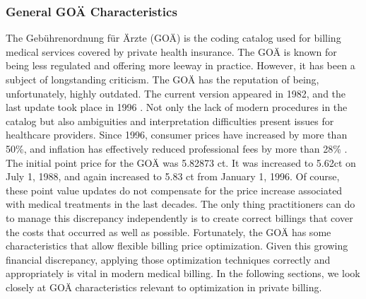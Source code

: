 \subsubsection{General GOÄ Characteristics}
The Gebührenordnung für Ärzte (GOÄ) is the coding catalog used for billing medical services covered by private health insurance.
The GOÄ is known for being less regulated and offering more leeway in practice.
However, it has been a subject of longstanding criticism.
The GOÄ has the reputation of being, unfortunately, highly outdated.
The current version appeared in 1982, and the last update took place in 1996 \cite{heller2015goa}.
Not only the lack of modern procedures in the catalog but also ambiguities and interpretation difficulties present issues for healthcare providers.
Since 1996, consumer prices have increased by more than 50\%, and inflation has effectively reduced professional fees by more than 28\% \cite{schmitzgoa}.
The initial point price for the GOÄ was 5.82873 ct.
It was increased to 5.62ct on July 1, 1988, and again increased to 5.83 ct from January 1, 1996\cite{hermanns2013bemessung}.
Of course, these point value updates do not compensate for the price increase associated with medical treatments in the last decades.
The only thing practitioners can do to manage this discrepancy independently is to create correct billings that cover the costs that occurred as well as possible.
Fortunately, the GOÄ has some characteristics that allow flexible billing price optimization.
Given this growing financial discrepancy, applying those optimization techniques correctly and appropriately is vital in modern medical billing.
In the following sections, we look closely at GOÄ characteristics relevant to optimization in private billing.


